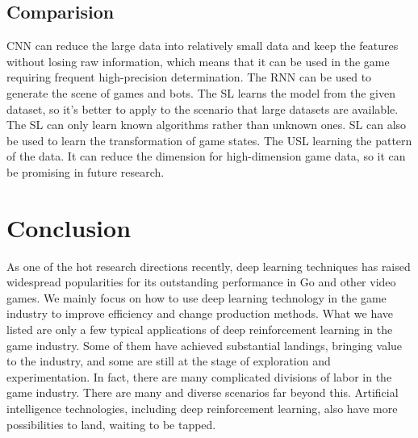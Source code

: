\documentclass[11pt,en]{elegantpaper}
\begin{document}
\subsection{Comparision}
CNN can reduce the large data into relatively small data and keep the features without losing raw information, which means that it can be used in the game requiring frequent high-precision determination. The RNN can be used to generate the scene of games and bots. The SL learns the model from the given dataset, so it's better to apply to the scenario that large datasets are available. The SL can only learn known algorithms rather than unknown ones. SL can also be used to learn the transformation of game states. The USL learning the pattern of the data. It can reduce the dimension for high-dimension game data, so it can be promising in future research. 

\section{Conclusion}
As one of the hot research directions recently, deep learning techniques has raised widespread popularities for its outstanding performance in Go and other video games. We mainly focus on how to use deep learning technology in the game industry to improve efficiency and change production methods. What we have listed are only a few typical applications of deep reinforcement learning in the game industry. Some of them have achieved substantial landings, bringing value to the industry, and some are still at the stage of exploration and experimentation. In fact, there are many complicated divisions of labor in the game industry. There are many and diverse scenarios far beyond this. Artificial intelligence technologies, including deep reinforcement learning, also have more possibilities to land, waiting to be tapped.


\end{document}
